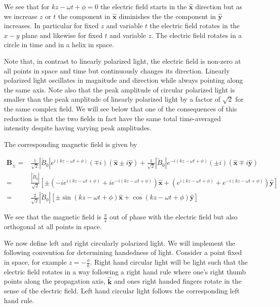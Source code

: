 \documentclass[12pt]{article}
\renewcommand{\vec}[1]{\boldsymbol{#1}}
\newcommand{\unitvec}[1]{\hat{\boldsymbol{#1}}}
\begin{document}
We see that for $kz-\omega t + \phi=0$ the electric field starts in the $\unitvec{x}$ direction but as we increase $z$ or $t$ the component in $\unitvec{x}$ diminishes the the component in $\unitvec{y}$ increases.
In particular for fixed $z$ and variable $t$ the electric field rotates in the $x-y$ plane and likewise for fixed $t$ and variable $z$.
The electric field rotates in a circle in time and in a helix in space.

Note that, in contrast to linearly polarized light, the electric field is non-zero at all points in space and time but continuously changes its direction.
Linearly polarized light oscillates in magnitude and direction while always pointing along the same axis.
Note also that the peak amplitude of circular polarized light is smaller than the peak amplitude of linearly polarized light by a factor of $\sqrt{2}$ for the same complex field. 
We will see below that one of the consequences of this reduction is that the two fields in fact have the same total time-averaged intensity despite having varying peak amplitudes.

The corresponding magnetic field is given by

\begin{align}
\vec{B}_{\pm} =& \frac{1}{\sqrt{2}} |\tilde{B}_0| e^{i(kz-\omega t + \phi)}(\mp i)(\unitvec{x} \pm i\unitvec{y}) + \frac{1}{\sqrt{2}} |\tilde{B}_0| e^{-i(kz-\omega t + \phi)}(\pm i)(\unitvec{x} \mp i\unitvec{y})\\
=& \frac{|\tilde{B}_0|}{\sqrt{2}} \left[\pm\left(-ie^{i(kz-\omega t + \phi)} + ie^{-i(kz-\omega t + \phi)} \right)\unitvec{x} + \left(e^{i(kz-\omega t + \phi)} + e^{-i(kz-\omega t + \phi)}\right)\unitvec{y}\right]\\
=& \frac{2}{\sqrt{2}}|\tilde{B}_0|\left[\pm\sin(kz-\omega t + \phi)\unitvec{x} + \cos(kz-\omega t + \phi)\unitvec{y}\right]
\end{align}

We see that the magnetic field is $\frac{\pi}{2}$ out of phase with the electric field but also orthogonal at all points in space.


We now define left and right circularly polarized light.
We will implement the following convention for determining handedness of light.
Consider a point fixed in space, for example $z = -\frac{\phi}{k}$. 
Right hand circular light will be light such that the electric field rotates in a way following a right hand rule where one's right thumb points along the propagation axis, $\unitvec{k}$ and ones right handed fingers rotate in the sense of the electric field. 
Left hand circular light follows the corresponding left hand rule.
\end{document}
